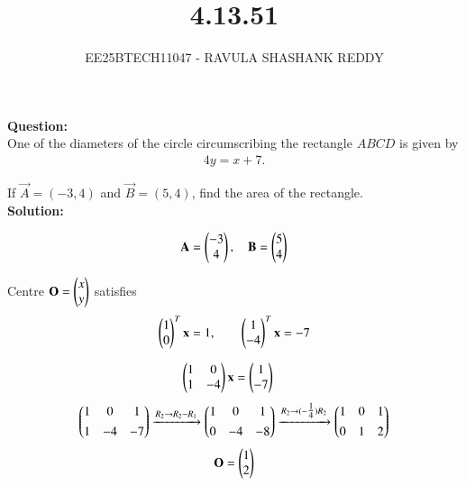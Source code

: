 \documentclass[journal]{article}
\begin{document}
	
	
	\vspace{3cm}
	
\title{4.13.51}
\author{EE25BTECH11047 - RAVULA SHASHANK REDDY}
\maketitle
\hrulefill
\bigskip 

\renewcommand{\thetable}{\theenumi}
\setlength{\intextsep}{10pt}

\textbf{Question:} \\

One of the diameters of the circle circumscribing the rectangle \(ABCD\) is given by
\begin{align*}
4y = x + 7.
\end{align*}

If \(\vec{A}=(-3,4)\) and \(\vec{B}=(5,4)\), find the area of the rectangle.\\

\textbf{Solution:}

\begin{align}
\mathbf{A}=\begin{pmatrix}-3\\4\end{pmatrix},\quad \mathbf{B}=\begin{pmatrix}5\\4\end{pmatrix}
\end{align}

Centre \(\mathbf{O}=\begin{pmatrix}x\\y\end{pmatrix}\) satisfies
\begin{align}
\begin{pmatrix}1 \\ 0\end{pmatrix}^T\mathbf{x}=1,\qquad \begin{pmatrix}1 \\ -4\end{pmatrix}^T\mathbf{x}=-7
\end{align}

\begin{align}
\begin{pmatrix}1 & 0\\ 1 & -4\end{pmatrix}\mathbf{x} &= \begin{pmatrix}1\\-7\end{pmatrix}
\end{align}
\begin{align}
\begin{pmatrix}1 & 0 & 1\\[4pt] 1 & -4 & -7\end{pmatrix}
\xrightarrow{R_2\rightarrow R_2-R_1}
\begin{pmatrix}1 & 0 & 1\\[4pt] 0 & -4 & -8\end{pmatrix}
\xrightarrow{R_2\rightarrow (-\tfrac{1}{4})R_2}
\begin{pmatrix}1 & 0 & 1\\[4pt] 0 & 1 & 2\end{pmatrix}
\end{align}
\begin{align}
    \mathbf{O}=\begin{pmatrix}1\\2\end{pmatrix}
\end{align}
\end{document}
